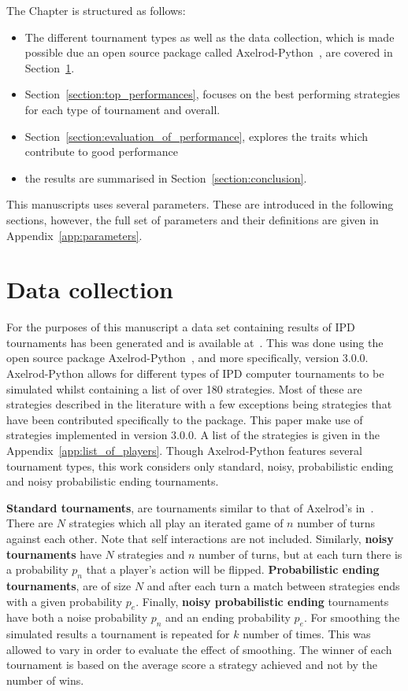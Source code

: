 The Chapter is structured as follows:

\begin{itemize}
    \item The different tournament types as well as the data collection, which is made
    possible due an open source package called Axelrod-Python~\cite{axelrodproject},
    are covered in Section~\ref{section:data_collection}.
    \item Section~\ref{section:top_performances}, focuses on the best performing
    strategies for each type of tournament and overall.
    \item Section~\ref{section:evaluation_of_performance}, explores the traits which
    contribute to good performance
    \item the results are summarised in
    Section~\ref{section:conclusion}.
\end{itemize}

This manuscripts uses several parameters. These are introduced in the following
sections, however, the full set of parameters and their definitions are given in
Appendix~\ref{app:parameters}.

\section{Data collection}\label{section:data_collection}

For the purposes of this manuscript a data set containing results of IPD
tournaments has been generated and is available at~\cite{Glynatsi_2019_metatournament}. This was done using the
open source package Axelrod-Python~\cite{axelrodproject}, and more specifically,
version 3.0.0. Axelrod-Python allows for different types of IPD computer
tournaments to be simulated whilst containing a list of over 180 strategies.
Most of these are strategies described in the literature with a few exceptions
being strategies that have been contributed specifically to the package. This
paper make use of \numberofstrategies strategies implemented in version 3.0.0. A
list of the strategies is given in the Appendix~\ref{app:list_of_players}.
Though Axelrod-Python features several tournament types, this work considers
only standard, noisy, probabilistic ending and noisy probabilistic ending
tournaments.

\textbf{Standard tournaments}, are tournaments similar to that of Axelrod's
in~\cite{Axelrod1980a}. There are \(N\) strategies which all play an iterated
game of \(n\) number of turns against each other. Note that self interactions
are not included. Similarly, \textbf{noisy
tournaments} have \(N\) strategies and \(n\) number of turns, but at each turn
there is a probability \(p_n\) that a player's action will be flipped.
\textbf{Probabilistic ending tournaments}, are of size \(N\) and after each turn
a match between strategies ends with a given probability \(p_e\). Finally,
\textbf{noisy probabilistic ending} tournaments have both a noise probability
\(p_n\) and an ending probability \(p_e\). For smoothing the simulated results a
tournament is repeated for \(k\) number of times. This was allowed to vary 
in order to evaluate the effect of smoothing. The winner of each tournament
is based on the average score a strategy achieved and not by the number of wins.

